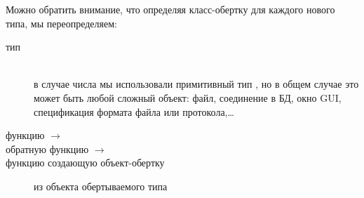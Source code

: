 
Можно обратить внимание, что определяя класс-обертку для каждого нового
типа, мы
переопределяем:
\begin{description}
\item[тип ]\ \\
в случае числа мы использовали примитивный тип , но в общем случае
это может быть любой сложный объект: файл, соединение в БД, окно GUI,
спецификация формата файла или протокола,\ldots
\item[функцию  $\rightarrow$ ]
\item[обратную функцию $\rightarrow$]
\item[функцию создающую объект-обертку] из объекта обертываемого типа
\end{description}

